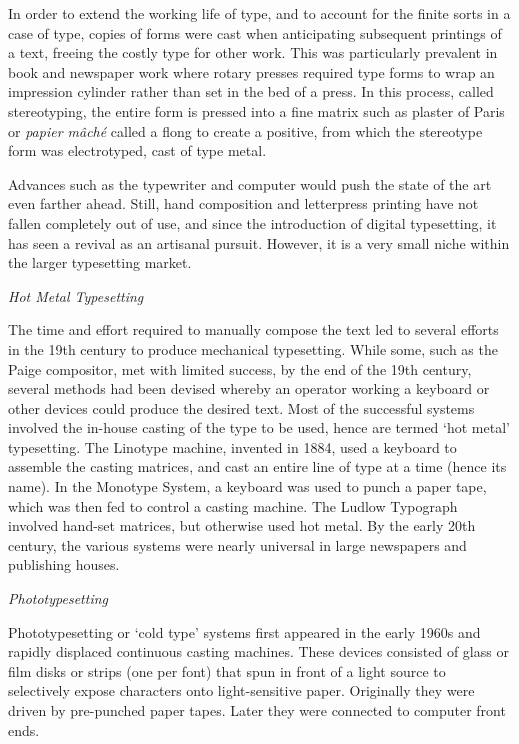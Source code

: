 \documentclass{slipbox}
\makeatletter
\def\subsection#1{\addvspace{\baselineskip}\noindent\textit{#1}\par\addvspace{\baselineskip}\@afterheading\@afterindentfalse}
\makeatother
\begin{document}
\begin{slip}
    In order to extend the working life of type, and to account for the finite sorts in a case of type, copies of forms were cast when anticipating subsequent printings of a text, freeing the costly type for other work. This was particularly prevalent in book and newspaper work where rotary presses required type forms to wrap an impression cylinder rather than set in the bed of a press. In this process, called stereotyping, the entire form is pressed into a fine matrix such as plaster of Paris or \emph{papier mâché} called a flong to create a positive, from which the stereotype form was electrotyped, cast of type metal.

    Advances such as the typewriter and computer would push the state of the art even farther ahead. Still, hand composition and letterpress printing have not fallen completely out of use, and since the introduction of digital typesetting, it has seen a revival as an artisanal pursuit. However, it is a very small niche within the larger typesetting market.

    \subsection{Hot Metal Typesetting}
    The time and effort required to manually compose the text led to several efforts in the 19th century to produce mechanical typesetting. While some, such as the Paige compositor, met with limited success, by the end of the 19th century, several methods had been devised whereby an operator working a keyboard or other devices could produce the desired text. Most of the successful systems involved the in-house casting of the type to be used, hence are termed `hot metal' typesetting. The Linotype machine, invented in 1884, used a keyboard to assemble the casting matrices, and cast an entire line of type at a time (hence its name). In the Monotype System, a keyboard was used to punch a paper tape, which was then fed to control a casting machine. The Ludlow Typograph involved hand-set matrices, but otherwise used hot metal. By the early 20th century, the various systems were nearly universal in large newspapers and publishing houses.

    \subsection{Phototypesetting}
    Phototypesetting or `cold type' systems first appeared in the early 1960s and rapidly displaced continuous casting machines. These devices consisted of glass or film disks or strips (one per font) that spun in front of a light source to selectively expose characters onto light-sensitive paper. Originally they were driven by pre-punched paper tapes. Later they were connected to computer front ends.


\end{slip}
\end{document}
